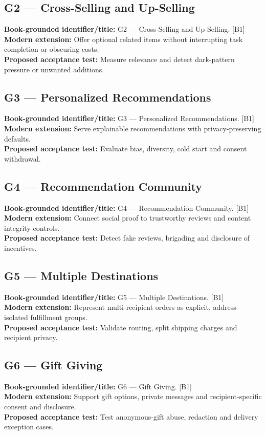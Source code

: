 \documentclass[11pt]{article}
\begin{document}
\subsection{G2 — Cross-Selling and Up-Selling}
\noindent\textcolor{Ocean}{\textbf{Book-grounded identifier/title:}} G2 — Cross-Selling and Up-Selling. [B1]\\
\textcolor{Mint}{\textbf{Modern extension:}} Offer optional related items without interrupting task completion or obscuring costs.\\
\textcolor{Amber}{\textbf{Proposed acceptance test:}} Measure relevance and detect dark-pattern pressure or unwanted additions.\medskip
\subsection{G3 — Personalized Recommendations}
\noindent\textcolor{Ocean}{\textbf{Book-grounded identifier/title:}} G3 — Personalized Recommendations. [B1]\\
\textcolor{Mint}{\textbf{Modern extension:}} Serve explainable recommendations with privacy-preserving defaults.\\
\textcolor{Amber}{\textbf{Proposed acceptance test:}} Evaluate bias, diversity, cold start and consent withdrawal.\medskip
\subsection{G4 — Recommendation Community}
\noindent\textcolor{Ocean}{\textbf{Book-grounded identifier/title:}} G4 — Recommendation Community. [B1]\\
\textcolor{Mint}{\textbf{Modern extension:}} Connect social proof to trustworthy reviews and content integrity controls.\\
\textcolor{Amber}{\textbf{Proposed acceptance test:}} Detect fake reviews, brigading and disclosure of incentives.\medskip
\subsection{G5 — Multiple Destinations}
\noindent\textcolor{Ocean}{\textbf{Book-grounded identifier/title:}} G5 — Multiple Destinations. [B1]\\
\textcolor{Mint}{\textbf{Modern extension:}} Represent multi-recipient orders as explicit, address-isolated fulfillment groups.\\
\textcolor{Amber}{\textbf{Proposed acceptance test:}} Validate routing, split shipping charges and recipient privacy.\medskip
\subsection{G6 — Gift Giving}
\noindent\textcolor{Ocean}{\textbf{Book-grounded identifier/title:}} G6 — Gift Giving. [B1]\\
\textcolor{Mint}{\textbf{Modern extension:}} Support gift options, private messages and recipient-specific consent and disclosure.\\
\textcolor{Amber}{\textbf{Proposed acceptance test:}} Test anonymous-gift abuse, redaction and delivery exception cases.\medskip
\end{document}
